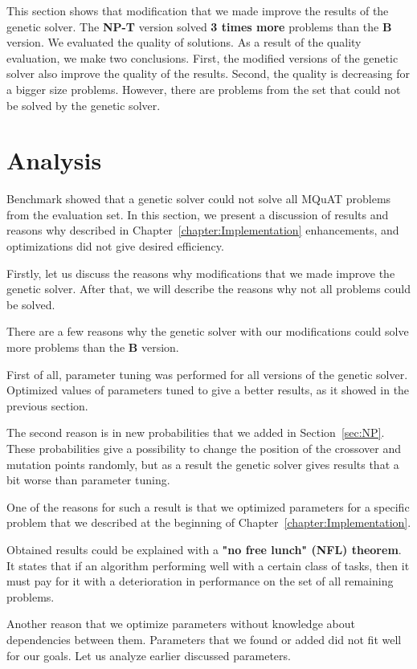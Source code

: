 This section shows that modification that we made improve the results of the genetic solver. The \textbf{NP-T} version solved \textbf{3 times more} problems than the \textbf{B} version. We evaluated the quality of solutions. As a result of the quality evaluation, we make two conclusions. First, the modified versions of the genetic solver also improve the quality of the results. Second, the quality is decreasing for a bigger size problems.
However, there are problems from the set that could not be solved by the genetic solver.


\section{Analysis}

Benchmark showed that a genetic solver could not solve all MQuAT problems from the evaluation set.
In this section, we present a discussion of results and reasons why described in Chapter~\ref{chapter:Implementation} enhancements, and optimizations did not give desired efficiency.

Firstly, let us discuss the reasons why modifications that we made improve the genetic solver. After that, we will describe the reasons why not all problems could be solved.

There are a few reasons why the genetic solver with our modifications could solve more problems than the \textbf{B} version. 

First of all, parameter tuning was performed for all versions of the genetic solver. Optimized values of parameters tuned to give a better results, as it showed in the previous section. 

The second reason is in new probabilities that we added in Section~\ref{sec:NP}. These probabilities give a possibility to change the position of the crossover and mutation points randomly, but as a result the genetic solver gives results that a bit worse than parameter tuning. 

One of the reasons for such a result is that we optimized parameters for a specific problem that we described at the beginning of Chapter~\ref{chapter:Implementation}.

Obtained results could be explained with a \textbf{"no free lunch" (NFL) theorem}\cite{wolpert1996, wolpert1997}. It states that if an algorithm performing well with a certain class of tasks, then it must pay for it with a deterioration in performance on the set of all remaining problems.

Another reason that we optimize parameters without knowledge about dependencies between them. Parameters that we found or added did not fit well for our goals. Let us analyze earlier discussed parameters.

